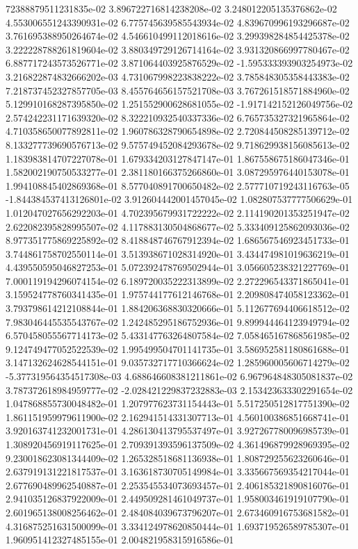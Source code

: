 72388879511231835e-02	3.896722716814238208e-02	3.248012205135376862e-02	4.553006551243390931e-02	6.775745639585543934e-02	4.839670996193296687e-02	3.761695388950264674e-02	4.546610499112018616e-02	3.299398284854425378e-02	3.222228788261819604e-02	3.880349729126714164e-02	3.931320866997780467e-02	6.887717243573526771e-02	3.871064403925876529e-02	-1.595333393903254973e-02	3.216822874832666202e-03	4.731067998223838222e-02	3.785848305358443383e-02	7.218737452327857705e-03	8.455764656157521708e-03	3.767261518571884960e-02	5.129910168287395850e-02	1.251552900628681055e-02	-1.917142152126049756e-02	2.574242231171639320e-02	8.322210932540337336e-02	6.765735327321965864e-02	4.710358650077892811e-02	1.960786328790654898e-02	2.720844508285139712e-02	8.133277739690576713e-02	9.575749452084293678e-02	9.718629938156085613e-02	1.183983814707227078e-01	1.679334203127847147e-01	1.867558675186047346e-01	1.582002190750533277e-01	2.381180166375266860e-01	3.087295976440153078e-01	1.994108845402869368e-01	8.577040891700650482e-02	2.577710719243116763e-05	-1.844384537413126801e-02	3.912604442001457045e-02	1.082807537777506629e-01	1.012047027656292203e-01	4.702395679931722222e-02	2.114190201353251947e-02	2.622082395828995507e-02	4.117883130504868677e-02	5.333409125862093036e-02	8.977351775869225892e-02	8.418848746767912394e-02	1.686567546923451733e-01	3.744861758702550114e-01	3.513938671028314920e-01	3.434474981019636219e-01	4.439550595046827253e-01	5.072392478769502944e-01	3.056605238321227769e-01	7.000119194296074154e-02	6.189720035222313899e-02	2.272296543371865041e-01	3.159524778760341435e-01	1.975744177612146768e-01	2.209808474058123362e-01	3.793798614212108844e-01	1.884206368830320666e-01	5.112677694406618512e-02	7.983046445535543767e-02	1.242485295186752936e-01	9.899944464123949794e-02	6.570458055567714173e-02	5.433147763264807584e-02	7.058465167868561985e-02	9.124749477052522539e-02	1.995499504701141735e-01	3.586952581180861688e-01	3.147132624628544151e-01	9.035732717710366624e-02	1.285960005606714279e-02	-5.377319564354517308e-03	4.688646608381211861e-02	6.967964848305081837e-02	3.787372618984959777e-02	-2.028421229837232883e-03	2.153423633302291654e-02	1.047868855730048482e-01	1.207977623731154443e-01	5.517250512817751390e-02	1.861151959979611900e-02	2.162941514331307713e-01	4.560100386851668741e-01	3.920163741232001731e-01	4.286130413795537497e-01	3.927267780096985739e-01	1.308920456919117625e-01	2.709391393596137509e-02	4.361496879928969395e-02	9.230018623081344409e-02	1.265328518681136938e-01	1.808729255623260646e-01	2.637919131221817537e-01	3.163618730705149984e-01	3.335667569354217044e-01	2.677690489962540887e-01	2.253545534073693457e-01	2.406185321890816076e-01	2.941035126837922009e-01	2.449509281461049737e-01	1.958003461919107790e-01	2.601965138008256462e-01	2.484084039673796207e-01	2.673460916753681582e-01	4.316875251631500099e-01	3.334124978620850444e-01	1.693719526589785307e-01	1.960951412327485155e-01	2.004821958315916586e-01
